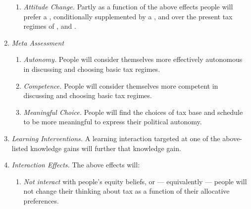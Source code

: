 \begin{enumerate}
\begin{enumerate}


		\item \label{itm:attitude-change} \emph{Attitude Change.}
		Partly as a function of the above effects %
		people will prefer a , conditionally supplemented by a ,  and  over the present tax regimes of ,  and .
	\end{enumerate}

	\item \label{itm:meta-assessment} \emph{Meta Assessment}

	\begin{enumerate}
		\item \label{itm:autonomy} \emph{Autonomy.}
		People will consider themselves more effectively autonomous in discussing and choosing basic tax regimes.

		\item \label{itm:competence} \emph{Competence.}
		People will consider themselves more competent in discussing and choosing basic tax regimes.

		\item \label{itm:meaningful-choice} \emph{Meaningful Choice.}
		People will find the choices of tax base and schedule to be more meaningful to express their political autonomy.
	\end{enumerate}

	\item \label{itm:learning-interventions} \emph{Learning Interventions.}
	A learning interaction targeted at one of the above-listed knowledge gains will further that knowledge gain.

	\item \label{itm:interaction-effects} \emph{Interaction Effects.}
	The above effects will:

	\begin{enumerate}
		\item \label{itm:interact-equity}
		\emph{Not interact} with people's equity beliefs, or --- equivalently --- people will not change their thinking about tax as a function of their allocative preferences.


\end{enumerate}
\end{enumerate}
